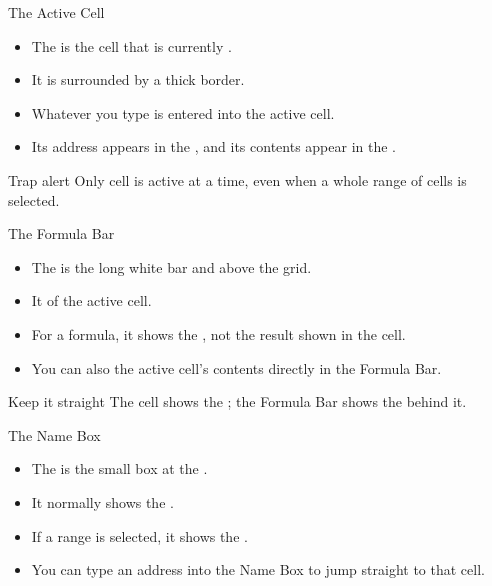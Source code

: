 \documentclass[aspectratio=169]{beamer}
\begin{document}
\begin{frame}{The Active Cell}
  \begin{itemize}
    \item The  is the cell that is currently
      .
    \item It is surrounded by a thick border.
    \item Whatever you type is entered into the active cell.
    \item Its address appears in the , and its contents appear
      in the .
  \end{itemize}
  \begin{alertblock}{Trap alert}
    Only  cell is active at a time, even when a whole range of cells
    is selected.
  \end{alertblock}
\end{frame}

\begin{frame}{The Formula Bar}
  \begin{itemize}
    \item The  is the long white bar 
      and above the grid.
    \item It  of the active cell.
    \item For a formula, it shows the , not the result
      shown in the cell.
    \item You can also  the active cell's contents directly in the
      Formula Bar.
  \end{itemize}
  \begin{block}{Keep it straight}
    The cell shows the ; the Formula Bar shows the
     behind it.
  \end{block}
\end{frame}

\begin{frame}{The Name Box}
  \begin{itemize}
    \item The  is the small box at the .
    \item It normally shows the .
    \item If a range is selected, it shows the .
    \item You can type an address into the Name Box to jump straight to that
      cell.
  \end{itemize}
\end{frame}
\end{document}
